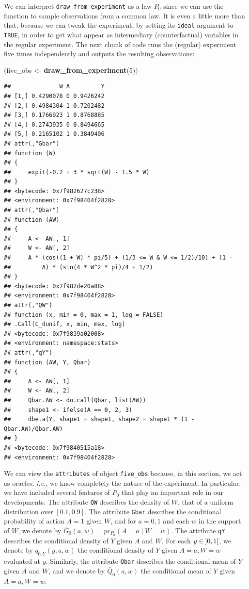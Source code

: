 \documentclass[]{article}
\newenvironment{Shaded}{\begin{snugshade}}{\end{snugshade}}
\newcommand{\DecValTok}[1]{\textcolor[rgb]{0.00,0.00,0.81}{#1}}
\newcommand{\KeywordTok}[1]{\textcolor[rgb]{0.13,0.29,0.53}{\textbf{#1}}}
\newcommand{\NormalTok}[1]{#1}
\newcommand{\StringTok}[1]{\textcolor[rgb]{0.31,0.60,0.02}{#1}}
\newcommand{\Gbar}{\bar{G}}
\newcommand{\Qbar}{\bar{Q}}
\theoremstyle{definition}
\theoremstyle{definition}
\theoremstyle{definition}
\theoremstyle{remark}
\begin{document}
We can interpret \texttt{draw\_from\_experiment} as a law \(P_{0}\)
since we can use the function to sample observations from a common law.
It is even a little more than that, because we can tweak the experiment,
by setting its \texttt{ideal} argument to \texttt{TRUE}, in order to get
what appear as intermediary (counterfactual) variables in the regular
experiment. The next chunk of code runs the (regular) experiment five
times independently and outputs the resulting observations:

\begin{Shaded}
\begin{Highlighting}[]
\NormalTok{(five_obs <-}\StringTok{ }\KeywordTok{draw_from_experiment}\NormalTok{(}\DecValTok{5}\NormalTok{))}
\end{Highlighting}
\end{Shaded}

\begin{verbatim}
##              W A         Y
## [1,] 0.4290078 0 0.9426242
## [2,] 0.4984304 1 0.7202482
## [3,] 0.1766923 1 0.8768885
## [4,] 0.2743935 0 0.8494665
## [5,] 0.2165102 1 0.3849406
## attr(,"Gbar")
## function (W) 
## {
##     expit(-0.2 + 3 * sqrt(W) - 1.5 * W)
## }
## <bytecode: 0x7f982627c238>
## <environment: 0x7f98404f2828>
## attr(,"Qbar")
## function (AW) 
## {
##     A <- AW[, 1]
##     W <- AW[, 2]
##     A * (cos((1 + W) * pi/5) + (1/3 <= W & W <= 1/2)/10) + (1 - 
##         A) * (sin(4 * W^2 * pi)/4 + 1/2)
## }
## <bytecode: 0x7f982de20a88>
## <environment: 0x7f98404f2828>
## attr(,"QW")
## function (x, min = 0, max = 1, log = FALSE) 
## .Call(C_dunif, x, min, max, log)
## <bytecode: 0x7f9839a02008>
## <environment: namespace:stats>
## attr(,"qY")
## function (AW, Y, Qbar) 
## {
##     A <- AW[, 1]
##     W <- AW[, 2]
##     Qbar.AW <- do.call(Qbar, list(AW))
##     shape1 <- ifelse(A == 0, 2, 3)
##     dbeta(Y, shape1 = shape1, shape2 = shape1 * (1 - Qbar.AW)/Qbar.AW)
## }
## <bytecode: 0x7f9840515a18>
## <environment: 0x7f98404f2828>
\end{verbatim}

We can view the \texttt{attributes} of object \texttt{five\_obs}
because, in this section, we act as oracles, \textit{i.e.}, we know
completely the nature of the experiment. In particular, we have included
several features of \(P_0\) that play an important role in our
developments. The attribute \texttt{QW} describes the density of \(W\),
that of a uniform distribution over \([0.1, 0.9]\). The attribute
\texttt{Gbar} describes the conditional probability of action \(A = 1\)
given \(W\), and for \(a = 0,1\) and each \(w\) in the support of \(W\),
we denote by \(\Gbar_0(a,w) = pr_{P_0}(A = a \mid W = w)\). The
attribute \texttt{qY} describes the conditional density of \(Y\) given
\(A\) and \(W\). For each \(y\in \interval[open]{0}{1}\), we denote by
\(q_{0,Y}(y, a, w)\) the conditional density of \(Y\) given
\(A = a, W = w\) evaluated at \(y\). Similarly, the attribute
\texttt{Qbar} describes the conditional mean of \(Y\) given \(A\) and
\(W\), and we denote by \(\Qbar_0(a,w)\) the conditional mean of \(Y\)
given \(A = a, W = w\).
\end{document}
